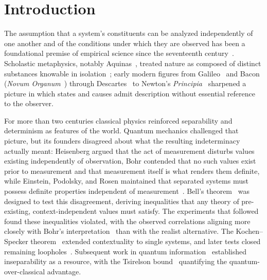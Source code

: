 \documentclass[aps,prl,twocolumn,superscriptaddress,amsmath,amssymb]{revtex4-2}
\begin{document}
\section{Introduction}
\label{sec:intro}

The assumption that a system's constituents can be analyzed independently of one another and of the conditions under which they are observed has been a foundational premise of empirical science since the seventeenth century~\cite{shapin1996scientific,dear2001revolutionizing}. Scholastic metaphysics, notably Aquinas~\cite{aquinas1274summa}, treated nature as composed of distinct substances knowable in isolation~\cite{crombie1959augustine}; early modern figures from Galileo~\cite{galileo1632dialogue} and Bacon (\textit{Novum Organum}~\cite{bacon1620novum}) through Descartes~\cite{descartes1641meditations} to Newton's \textit{Principia}~\cite{newton1687principia} sharpened a picture in which states and causes admit description without essential reference to the observer.

For more than two centuries classical physics reinforced separability and determinism as features of the world. Quantum mechanics challenged that picture, but its founders disagreed about what the resulting indeterminacy actually meant: Heisenberg argued that the act of measurement disturbs values existing independently of observation, Bohr contended that no such values exist prior to measurement and that measurement itself is what renders them definite, while Einstein, Podolsky, and Rosen maintained that separated systems must possess definite properties independent of measurement~\cite{einstein1935,howard1985einstein,howard1989holism}. Bell's theorem~\cite{bell1964,bell1966problem} was designed to test this disagreement, deriving inequalities that any theory of pre-existing, context-independent values must satisfy. The experiments that followed~\cite{clauser1969,aspect1982experimental} found these inequalities violated, with the observed correlations aligning more closely with Bohr's interpretation~\cite{bohr1935can} than with the realist alternative. The Kochen--Specker theorem~\cite{kochen1967problem} extended contextuality to single systems, and later tests closed remaining loopholes~\cite{hensen2015loophole,giustina2015significant,shalm2015strong,rauch2018cosmic}. Subsequent work in quantum information~\cite{deutsch1985quantum,shor1997polynomial,nielsen2000quantum} established inseparability as a resource, with the Tsirelson bound~\cite{tsirelson1980quantum} quantifying the quantum-over-classical advantage.
\end{document}
